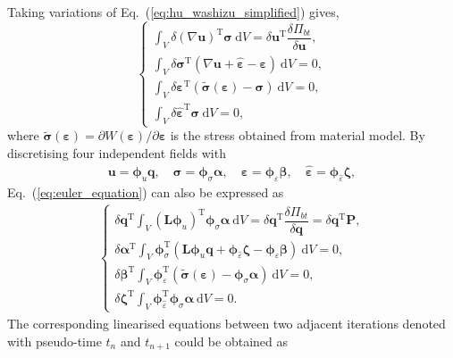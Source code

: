 \documentclass[3p,sort&compress,review,11pt]{elsarticle}
\newcommand*{\md}[1]{\mathrm{d}#1}
\newcommand*{\va}[1]{\delta#1}
\newcommand*{\mT}{\mathrm{T}}
\newcommand*{\vfrac}[2]{\dfrac{\va#1}{\va#2}}
\newcommand*{\eqsref}[1]{Eq.~(\ref{#1})}
\newcommand*{\mb}{\bm}
\begin{document}
Taking variations of \eqsref{eq:hu_washizu_simplified} gives,
\begin{equation}\label{eq:euler_equation}
\left\{\begin{array}{l}
\displaystyle\int_V\va{\left(\nabla\mb{u}\right)}^\mT\mb{\sigma}~\md{V}=\va{\mb{u}}^\mT\vfrac{\varPi_{bt}}{\mb{u}},\\[3mm]
\displaystyle\int_V\va{\mb{\sigma}}^\mT\left(\nabla\mb{u}+\hat{\mb{\varepsilon}}-\mb{\varepsilon}\right)~\md{V}=0,\\[3mm]
\displaystyle\int_V\va{\mb{\varepsilon}}^\mT\left(\tilde{\mb{\sigma}}\left(\mb{\varepsilon}\right)-\mb{\sigma}\right)~\md{V}=0,\\[3mm]
\displaystyle\int_V\va{\hat{\mb{\varepsilon}}}^\mT\mb{\sigma}~\md{V}=0,
\end{array}\right.
\end{equation}
where $\tilde{\mb{\sigma}}\left(\mb{\varepsilon}\right)=\partial{}W\left(\mb{\varepsilon}\right)/\partial\mb{\varepsilon}$ is the stress obtained from material model. By discretising four independent fields with
\begin{gather*}
\mb{u}=\mb{\phi}_u\mb{q},\quad
\mb{\sigma}=\mb{\phi}_\sigma\mb{\alpha},\quad
\mb{\varepsilon}=\mb{\phi}_\varepsilon\mb{\beta},\quad
\hat{\mb{\varepsilon}}=\mb{\phi}_{\hat{\varepsilon}}\mb{\zeta},
\end{gather*}
\eqsref{eq:euler_equation} can also be expressed as
\begin{gather}\label{eq:discretised_euler_equation}
\left\{\begin{array}{l}
\displaystyle\va{\mb{q}^\mT}\int_V\left(\mb{L}\mb{\phi}_u\right)^\mT\mb{\phi}_\sigma\mb{\alpha}~\md{V}=\va{\mb{q}}^\mT\vfrac{\varPi_{bt}}{\mb{q}}=\va{\mb{q}}^\mT\mb{P},\\[3mm]
\displaystyle\va{\mb{\alpha}^\mT}\int_V\mb{\phi}_\sigma^\mT\left(\mb{L}\mb{\phi}_u\mb{q}+\mb{\phi}_{\hat{\varepsilon}}\mb{\zeta}-\mb{\phi}_\varepsilon\mb{\beta}\right)~\md{V}=0,\\[3mm]
\displaystyle\va{\mb{\beta}^\mT}\int_V\mb{\phi}_\varepsilon^\mT\left(\tilde{\mb{\sigma}}\left(\mb{\varepsilon}\right)-\mb{\phi}_\sigma\mb{\alpha}\right)~\md{V}=0,\\[3mm]
\displaystyle\va{\mb{\zeta}^\mT}\int_V\mb{\phi}_{\hat{\varepsilon}}^\mT\mb{\phi}_\sigma\mb{\alpha}~\md{V}=0.
\end{array}\right.
\end{gather}
The corresponding linearised equations between two adjacent iterations denoted with pseudo-time $t_n$ and $t_{n+1}$ could be obtained as
\end{document}
